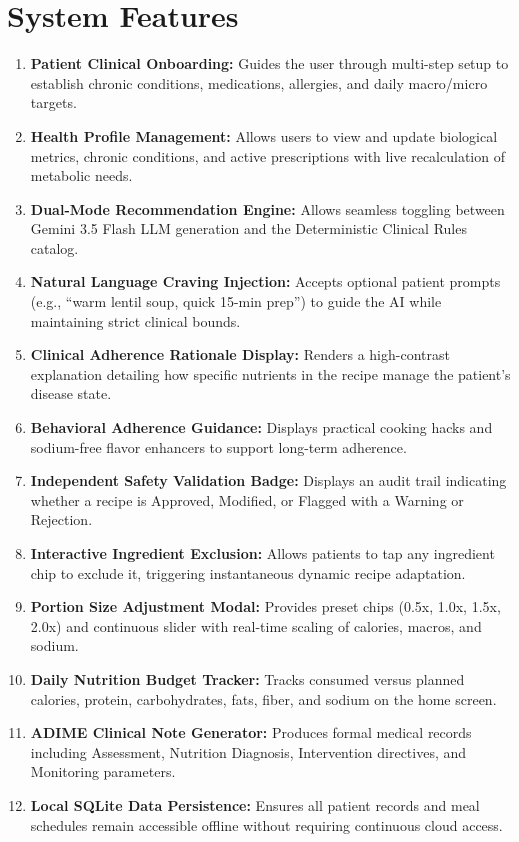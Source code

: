 \documentclass[a4paper,12pt]{report}
\begin{document}
\section{System Features}
\begin{enumerate}

\item \textbf{Patient Clinical Onboarding:}
Guides the user through multi-step setup to establish chronic conditions, medications, allergies, and daily macro/micro targets.

\item \textbf{Health Profile Management:}
Allows users to view and update biological metrics, chronic conditions, and active prescriptions with live recalculation of metabolic needs.

\item \textbf{Dual-Mode Recommendation Engine:}
Allows seamless toggling between Gemini 3.5 Flash LLM generation and the Deterministic Clinical Rules catalog.

\item \textbf{Natural Language Craving Injection:}
Accepts optional patient prompts (e.g., ``warm lentil soup, quick 15-min prep'') to guide the AI while maintaining strict clinical bounds.

\item \textbf{Clinical Adherence Rationale Display:}
Renders a high-contrast explanation detailing how specific nutrients in the recipe manage the patient's disease state.

\item \textbf{Behavioral Adherence Guidance:}
Displays practical cooking hacks and sodium-free flavor enhancers to support long-term adherence.

\item \textbf{Independent Safety Validation Badge:}
Displays an audit trail indicating whether a recipe is Approved, Modified, or Flagged with a Warning or Rejection.

\item \textbf{Interactive Ingredient Exclusion:}
Allows patients to tap any ingredient chip to exclude it, triggering instantaneous dynamic recipe adaptation.

\item \textbf{Portion Size Adjustment Modal:}
Provides preset chips (0.5x, 1.0x, 1.5x, 2.0x) and continuous slider with real-time scaling of calories, macros, and sodium.

\item \textbf{Daily Nutrition Budget Tracker:}
Tracks consumed versus planned calories, protein, carbohydrates, fats, fiber, and sodium on the home screen.

\item \textbf{ADIME Clinical Note Generator:}
Produces formal medical records including Assessment, Nutrition Diagnosis, Intervention directives, and Monitoring parameters.

\item \textbf{Local SQLite Data Persistence:}
Ensures all patient records and meal schedules remain accessible offline without requiring continuous cloud access.

\end{enumerate}
\end{document}
